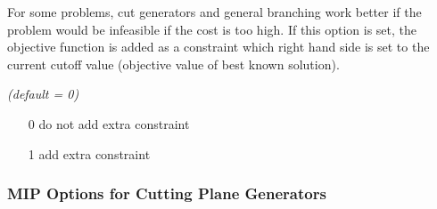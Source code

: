\begin{description}
For some problems, cut generators and general branching work better if the problem would be infeasible if the cost is too high.
If this option is set, the objective function is added as a constraint which right hand side is set to the current cutoff value (objective value of best known solution).

\textsl{(default = 0)}
\begin{itemize}
\item[0] 
do not add extra constraint
\item[1] 
add extra constraint
\end{itemize}

\end{description}

\subsubsection{MIP Options for Cutting Plane Generators}

